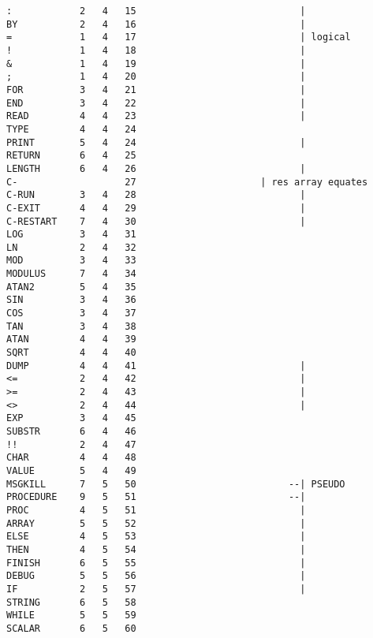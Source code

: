 \begin{verbatim}
:            2   4   15                             |
BY           2   4   16                             |
=            1   4   17                             | logical
!            1   4   18                             |
&            1   4   19                             |
;            1   4   20                             |
FOR          3   4   21                             |
END          3   4   22                             |
READ         4   4   23                             |
TYPE         4   4   24
PRINT        5   4   24                             |
RETURN       6   4   25
LENGTH       6   4   26                             |
C-                   27                      | res array equates
C-RUN        3   4   28                             |
C-EXIT       4   4   29                             |
C-RESTART    7   4   30                             |
LOG          3   4   31
LN           2   4   32
MOD          3   4   33
MODULUS      7   4   34
ATAN2        5   4   35
SIN          3   4   36
COS          3   4   37
TAN          3   4   38
ATAN         4   4   39
SQRT         4   4   40
DUMP         4   4   41                             |
<=           2   4   42                             |
>=           2   4   43                             |
<>           2   4   44                             |
EXP          3   4   45
SUBSTR       6   4   46
!!           2   4   47
CHAR         4   4   48
VALUE        5   4   49
MSGKILL      7   5   50                           --| PSEUDO
PROCEDURE    9   5   51                           --|
PROC         4   5   51                             |
ARRAY        5   5   52                             |
ELSE         4   5   53                             |
THEN         4   5   54                             |
FINISH       6   5   55                             |
DEBUG        5   5   56                             |
IF           2   5   57                             |
STRING       6   5   58
WHILE        5   5   59
SCALAR       6   5   60
\end{verbatim}
